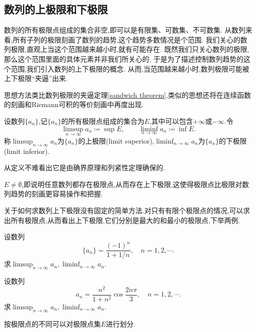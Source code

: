 \subsection{数列的上极限和下极限}


数列的所有极限点组成的集合非空,即可以是有限集、可数集、不可数集.
从数列来看,所有子列的极限刻画了数列的趋势,这个趋势多数情况是个范围.
我们关心的数列极限,直观上当这个范围越来越小时,就有可能存在.
既然我们只关心数列的极限,那么这个范围里面的具体元素并非我们所关心的.
于是为了描述控制数列趋势的这个范围,我们引入数列的上下极限的概念.
从而,当范围越来越小时,数列极限可能被上下极限“夹逼”出来.

\begin{note}
    思想方法类比数列极限的夹逼定理\ref{sandwich theorem},类似的思想还将在连续函数的刻画和Riemann可积的等价刻画中再度出现.
\end{note}

\begin{definition}
    设数列$\{a_n\}$,记$\{a_n\}$的所有极限点组成的集合为$E$,其中可以包含$+\infty$或$-\infty$.令
    \[\limsup_{n\to\infty}a_n\coloneq\sup E,\qquad\liminf_{n\to\infty}a_n\coloneq\inf E.\]
    称$\limsup_{n\to\infty}a_n$为$\{a_n\}$的上极限(limit superior),$\liminf_{n\to\infty}a_n$为$\{a_n\}$的下极限(limit inferior).
\end{definition}

\begin{note}
    从定义不难看出它是由确界原理和列紧性定理确保的.
\end{note}

$E\ne \emptyset$,即说明任意数列都存在极限点,从而存在上下极限,这使得极限点比极限对数列趋势的刻画更容易操作和把握.

关于如何求数列上下极限没有固定的简单方法.对只有有限个极限点的情况,可以求出所有极限点,从而看出上下极限,它们分别是最大的和最小的极限点,下举两例.

\begin{example}
    设数列
    \[\{a_n\}=\frac{(-1)^n}{1+1/n},\quad n=1,2,\cdots.\]
    求$\limsup_{n\to\infty}a_n,\liminf_{n\to\infty}a_n.$
\end{example}

\begin{example}
    设数列
    \[a_n=\frac{n^2}{1+n^2}\cos\frac{2n\pi}{3},\quad n=1,2,\cdots.\]
    求$\limsup_{n\to\infty}a_n,\liminf_{n\to\infty}a_n.$
\end{example}

\begin{note}
    按极限点的不同可以对极限点集$E$进行划分.
\end{note}


